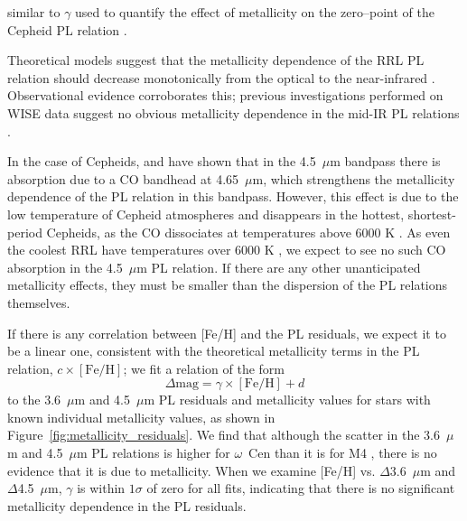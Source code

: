 \documentclass[a4paper,fleqn,usenatbib]{mnras}
\begin{document}
similar to $\gamma$ used to quantify the effect of metallicity on the zero--point of the Cepheid PL relation \citep{1998ApJ...498..181K}. 

Theoretical models suggest that the metallicity dependence of the RRL PL relation should decrease monotonically from the optical to the near-infrared \citep{2001MNRAS.326.1183B, 2004ApJS..154..633C}. Observational evidence corroborates this; previous investigations performed on WISE data suggest no obvious metallicity dependence in the mid-IR PL relations \citep{2013ApJ...776..135M}.

In the case of Cepheids, \citet{2011ApJ...743...76S} and \citet{2015arXiv150206995S} have shown that in the 4.5~$\mu$m bandpass there is absorption due to a CO bandhead at 4.65~$\mu$m, which strengthens the metallicity dependence of the PL relation in this bandpass. However, this effect is due to the low temperature of Cepheid atmospheres and disappears in the hottest, shortest-period Cepheids, as the CO dissociates at temperatures above 6000 K \citep{2012ApJ...759..146M}. As even the coolest RRL have temperatures over 6000 K \citep{1971PASP...83..697I}, we expect to see no such CO absorption in the 4.5~$\mu$m PL relation. If there are any other unanticipated metallicity effects, they must be smaller than the dispersion of the PL relations themselves.

If there is any correlation between [Fe/H] and the PL residuals, we expect it to be a linear one, consistent with the theoretical metallicity terms in the PL relation, $c\times[\text{Fe/H}]$; we fit a relation of the form
\begin{equation}
\Delta\text{mag} = \gamma \times[\text{Fe/H}] + d
\end{equation}
to the 3.6~$\mu$m and 4.5~$\mu$m PL residuals and metallicity values for stars with known individual metallicity values, as shown in Figure~\ref{fig:metallicity_residuals}. We find that although the scatter in the 3.6~$\mu$m and 4.5~$\mu$m PL relations is higher for $\omega$~Cen than it is for M4 \citep{2015arXiv150507858N, 2015ApJ...799..165B}, there is no evidence that it is due to metallicity. When we examine [Fe/H] vs. $\Delta$3.6~$\mu$m and $\Delta$4.5~$\mu$m, $\gamma$ is within $1\sigma$ of zero for all fits, indicating that there is no significant metallicity dependence in the PL residuals.
\end{document}
